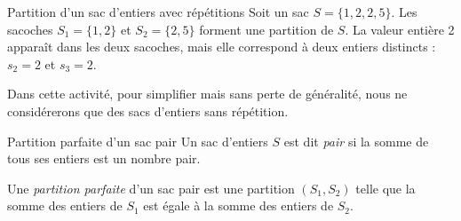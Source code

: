 \documentclass[a4paper,twoside]{article}
\begin{document}


  \begin{exemple}{Partition d'un sac d'entiers avec répétitions}
    Soit un sac $S = \{1,2,2,5\}$.
    Les sacoches $S_1 = \{1, 2\}$ et $S_2 = \{2, 5\}$ forment une partition de $S$.
    La valeur entière 2 apparaît dans les deux sacoches, mais elle correspond à deux entiers distincts : $s_2 = 2$ et $s_3 = 2$.

    Dans cette activité, pour simplifier mais sans perte de généralité, nous ne considérerons que des sacs d'entiers sans répétition.
  \end{exemple}

  \begin{definition}{Partition parfaite d'un sac pair}
    Un sac d'entiers $S$ est dit \emph{pair} si la somme de tous ses entiers est un nombre pair.

    Une \emph{partition parfaite} d'un sac pair est une partition $(S_1,S_2)$ telle que
    la somme des entiers de $S_1$ est égale à la somme des entiers de $S_2$.
  \end{definition}
\end{document}
